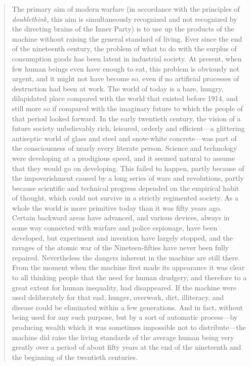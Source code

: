 \begin{quotation}
The primary aim of modern warfare (in accordance with the principles of
\emph{doublethink}, this aim is simultaneously recognized and not
recognized by the directing brains of the Inner Party) is to use up the
products of the machine without raising the general standard of living.
Ever since the end of the nineteenth century, the problem of what to do
with the surplus of consumption goods has been latent in industrial
society. At present, when few human beings even have enough to eat, this
problem is obviously not urgent, and it might not have become so, even
if no artificial processes of destruction had been at work. The world of
today is a bare, hungry, dilapidated place compared with the world that
existed before 1914, and still more so if compared with the imaginary
future to which the people of that period looked forward. In the early
twentieth century, the vision of a future society unbelievably rich,
leisured, orderly and efficient---a glittering antiseptic world of glass
and steel and snow-white concrete---was part of the consciousness of
nearly every literate person. Science and technology were developing at
a prodigious speed, and it seemed natural to assume that they would go
on developing. This failed to happen, partly because of the
impoverishment caused by a long series of wars and revolutions, partly
because scientific and technical progress depended on the empirical
habit of thought, which could not survive in a strictly regimented
society. As a whole the world is more primitive today than it was fifty
years ago. Certain backward areas have advanced, and various devices,
always in some way connected with warfare and police espionage, have
been developed, but experiment and invention have largely stopped, and
the ravages of the atomic war of the Nineteen-fifties have never been
fully repaired. Nevertheless the dangers inherent in the machine are
still there. From the moment when the machine first made its appearance
it was clear to all thinking people that the need for human drudgery,
and therefore to a great extent for human inequality, had disappeared.
If the machine were used deliberately for that end, hunger, overwork,
dirt, illiteracy, and disease could be eliminated within a few
generations. And in fact, without being used for any such purpose, but
by a sort of automatic process---by producing wealth which it was
sometimes impossible not to distribute---the machine did raise the
living standards of the average human being very greatly over a period
of about fifty years at the end of the nineteenth and the beginning of
the twentieth centuries.


\end{quotation}
